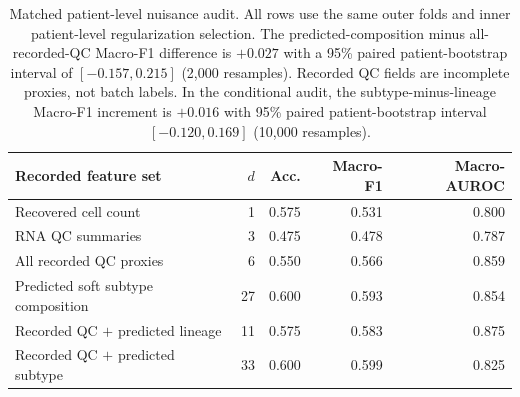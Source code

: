 \begin{table}[H]
\centering
\small
\setlength{\tabcolsep}{5pt}
\begin{tabular}{lrrrr}
\toprule
\textbf{Recorded feature set} & \textbf{$d$} & \textbf{Acc.} & \textbf{Macro-F1} & \textbf{Macro-AUROC} \\
\midrule
Recovered cell count & 1 & 0.575 & 0.531 & 0.800 \\
RNA QC summaries & 3 & 0.475 & 0.478 & 0.787 \\
All recorded QC proxies & 6 & 0.550 & 0.566 & 0.859 \\
Predicted soft subtype composition & 27 & 0.600 & 0.593 & 0.854 \\
Recorded QC $+$ predicted lineage & 11 & 0.575 & 0.583 & 0.875 \\
Recorded QC $+$ predicted subtype & 33 & 0.600 & 0.599 & 0.825 \\
\bottomrule
\end{tabular}
\caption{Matched patient-level nuisance audit. All rows use the same outer
folds and inner patient-level regularization selection. The predicted-composition
minus all-recorded-QC Macro-F1 difference is $+0.027$ with a 95\% paired
patient-bootstrap interval of $[-0.157,0.215]$ (2{,}000 resamples). Recorded
QC fields are incomplete proxies, not batch labels. In the conditional audit,
the subtype-minus-lineage Macro-F1 increment is $+0.016$ with 95\% paired
patient-bootstrap interval $[-0.120,0.169]$ (10{,}000 resamples).}
\label{tab:technical_covariate_audit}
\end{table}
